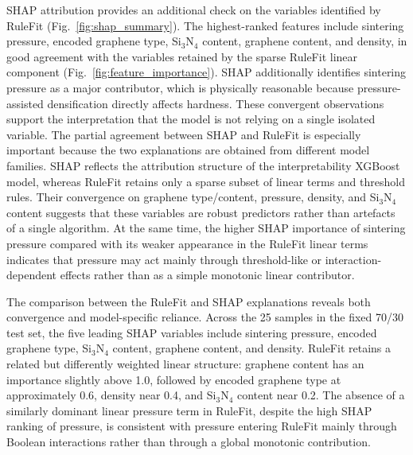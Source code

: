 \documentclass[pdflatex,sn-mathphys-num]{sn-jnl}%
\newif\ifrevmarks%
\newcommand{\revmark}[1]{\ifrevmarks\textcolor{revblue}{#1}\else#1\fi}%
\theoremstyle{thmstyleone}%
\theoremstyle{thmstyletwo}%
\theoremstyle{thmstylethree}%
\begin{document}
\revmark{SHAP attribution provides an additional check on the variables identified by RuleFit (Fig.~\ref{fig:shap_summary}). The highest-ranked features include sintering pressure, encoded graphene type, Si$_3$N$_4$ content, graphene content, and density, in good agreement with the variables retained by the sparse RuleFit linear component (Fig.~\ref{fig:feature_importance}). SHAP additionally identifies sintering pressure as a major contributor, which is physically reasonable because pressure-assisted densification directly affects hardness. These convergent observations support the interpretation that the model is not relying on a single isolated variable. The partial agreement between SHAP and RuleFit is especially important because the two explanations are obtained from different model families. SHAP reflects the attribution structure of the interpretability XGBoost model, whereas RuleFit retains only a sparse subset of linear terms and threshold rules. Their convergence on graphene type/content, pressure, density, and Si$_3$N$_4$ content suggests that these variables are robust predictors rather than artefacts of a single algorithm. At the same time, the higher SHAP importance of sintering pressure compared with its weaker appearance in the RuleFit linear terms indicates that pressure may act mainly through threshold-like or interaction-dependent effects rather than as a simple monotonic linear contributor.}

The comparison between the RuleFit and SHAP explanations reveals both convergence and model-specific reliance. Across the 25 samples in the fixed 70/30 test set, the five leading SHAP variables include sintering pressure, encoded graphene type, Si$_3$N$_4$ content, graphene content, and density. RuleFit retains a related but differently weighted linear structure: graphene content has an importance slightly above 1.0, followed by encoded graphene type at approximately 0.6, density near 0.4, and Si$_3$N$_4$ content near 0.2. The absence of a similarly dominant linear pressure term in RuleFit, despite the high SHAP ranking of pressure, is consistent with pressure entering RuleFit mainly through Boolean interactions rather than through a global monotonic contribution.
\end{document}
